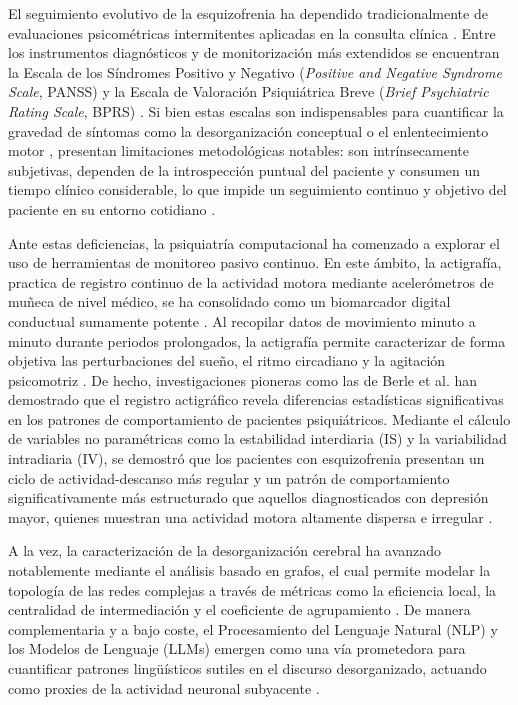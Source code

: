 \documentclass[12pt,a4paper,onecolumn,oneside]{report}
\begin{document}
El seguimiento evolutivo de la esquizofrenia ha dependido tradicionalmente de evaluaciones psicométricas intermitentes aplicadas en la consulta clínica \cite{saboori2025predictive}. Entre los instrumentos diagnósticos y de monitorización más extendidos se encuentran la Escala de los Síndromes Positivo y Negativo (\textit{Positive and Negative Syndrome Scale}, PANSS) \cite{kay1987panss} y la Escala de Valoración Psiquiátrica Breve (\textit{Brief Psychiatric Rating Scale}, BPRS) \cite{overall1962bprs}. Si bien estas escalas son indispensables para cuantificar la gravedad de síntomas como la desorganización conceptual o el enlentecimiento motor \cite{overall1962bprs}, presentan limitaciones metodológicas notables: son intrínsecamente subjetivas, dependen de la introspección puntual del paciente y consumen un tiempo clínico considerable, lo que impide un seguimiento continuo y objetivo del paciente en su entorno cotidiano \cite{saboori2025predictive, zapata2015psicoeducacion}.

Ante estas deficiencias, la psiquiatría computacional ha comenzado a explorar el uso de herramientas de monitoreo pasivo continuo. En este ámbito, la actigrafía, practica de registro continuo de la actividad motora mediante acelerómetros de muñeca de nivel médico, se ha consolidado como un biomarcador digital conductual sumamente potente \cite{berle2010actigraphic}. Al recopilar datos de movimiento minuto a minuto durante periodos prolongados, la actigrafía permite caracterizar de forma objetiva las perturbaciones del sueño, el ritmo circadiano y la agitación psicomotriz \cite{berle2010actigraphic}. De hecho, investigaciones pioneras como las de Berle et al. \cite{berle2010actigraphic} han demostrado que el registro actigráfico revela diferencias estadísticas significativas en los patrones de comportamiento de pacientes psiquiátricos. Mediante el cálculo de variables no paramétricas como la estabilidad interdiaria (IS) y la variabilidad intradiaria (IV), se demostró que los pacientes con esquizofrenia presentan un ciclo de actividad-descanso más regular y un patrón de comportamiento significativamente más estructurado que aquellos diagnosticados con depresión mayor, quienes muestran una actividad motora altamente dispersa e irregular \cite{berle2010actigraphic}.

A la vez, la caracterización de la desorganización cerebral ha avanzado notablemente mediante el análisis basado en grafos, el cual permite modelar la topología de las redes complejas a través de métricas como la eficiencia local, la centralidad de intermediación y el coeficiente de agrupamiento \cite{Tyagi}. De manera complementaria y a bajo coste, el Procesamiento del Lenguaje Natural (NLP) y los Modelos de Lenguaje (LLMs) emergen como una vía prometedora para cuantificar patrones lingüísticos sutiles en el discurso desorganizado, actuando como proxies de la actividad neuronal subyacente \cite{Tyagi}. 
\end{document}
